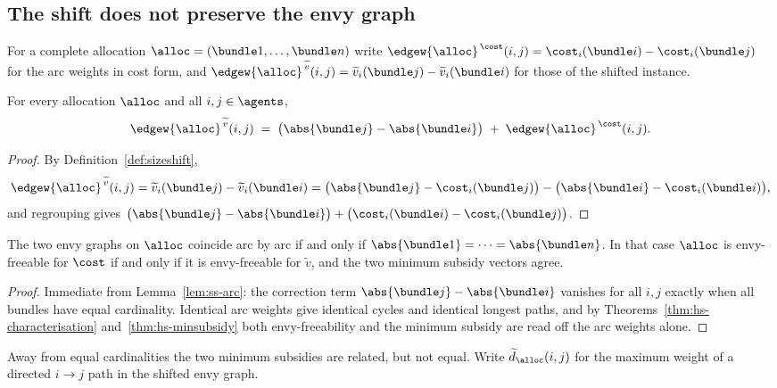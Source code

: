 \subsection{The shift does not preserve the envy graph}

For a complete allocation $\alloc = (\bundle1,\dots,\bundle n)$ write
$\edgew{\alloc}^{\,\cost}(i,j) = \cost_i(\bundle i) - \cost_i(\bundle j)$ for
the arc weights in cost form, and
$\edgew{\alloc}^{\,\widetilde{v}}(i,j) = \widetilde{v}_i(\bundle j) - \widetilde{v}_i(\bundle i)$
for those of the shifted instance.

\begin{lemma}
\label{lem:ss-arc}
For every allocation $\alloc$ and all $i,j \in \agents$,
\[
  \edgew{\alloc}^{\,\widetilde{v}}(i,j)
  \;=\; \bigl(\abs{\bundle j} - \abs{\bundle i}\bigr)
      \;+\; \edgew{\alloc}^{\,\cost}(i,j).
\]
\end{lemma}

\begin{proof}
By Definition~\ref{def:sizeshift},
\[
  \edgew{\alloc}^{\,\widetilde{v}}(i,j)
  = \widetilde{v}_i(\bundle j) - \widetilde{v}_i(\bundle i)
  = \bigl(\abs{\bundle j} - \cost_i(\bundle j)\bigr)
    - \bigl(\abs{\bundle i} - \cost_i(\bundle i)\bigr),
\]
and regrouping gives
$\bigl(\abs{\bundle j} - \abs{\bundle i}\bigr) + \bigl(\cost_i(\bundle i) - \cost_i(\bundle j)\bigr)$.
\end{proof}

\begin{corollary}
\label{cor:ss-equalcard}
The two envy graphs on $\alloc$ coincide arc by arc if and only if
$\abs{\bundle 1} = \dots = \abs{\bundle n}$. In that case $\alloc$ is
envy-freeable for $\cost$ if and only if it is envy-freeable for
$\widetilde{v}$, and the two minimum subsidy vectors agree.
\end{corollary}

\begin{proof}
Immediate from Lemma~\ref{lem:ss-arc}: the correction term
$\abs{\bundle j} - \abs{\bundle i}$ vanishes for all $i,j$ exactly when all
bundles have equal cardinality. Identical arc weights give identical cycles and
identical longest paths, and by
Theorems~\ref{thm:hs-characterisation} and~\ref{thm:hs-minsubsidy} both envy-freeability
and the minimum subsidy are read off the arc weights alone.
\end{proof}

Away from equal cardinalities the two minimum subsidies are related, but not
equal. Write $\widetilde{d}_{\alloc}(i,j)$ for the maximum weight of a directed
$i \to j$ path in the shifted envy graph.

